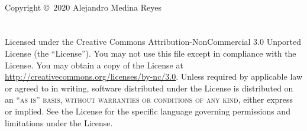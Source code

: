\documentclass[11pt,fleqn]{book} %
\begin{document}

\begingroup
\thispagestyle{empty} %
\vfill
\endgroup


\newpage
~\vfill
\thispagestyle{empty}

\noindent Copyright \copyright\ 2020 Alejandro Medina Reyes\\ %

\noindent \textsc{}\\ %

\noindent \textsc{}\\ %

\noindent Licensed under the Creative Commons Attribution-NonCommercial 3.0 Unported License (the ``License''). You may not use this file except in compliance with the License. You may obtain a copy of the License at \url{http://creativecommons.org/licenses/by-nc/3.0}. Unless required by applicable law or agreed to in writing, software distributed under the License is distributed on an \textsc{``as is'' basis, without warranties or conditions of any kind}, either express or implied. See the License for the specific language governing permissions and limitations under the License.\\ %

\noindent \textit{} %

\end{document}

